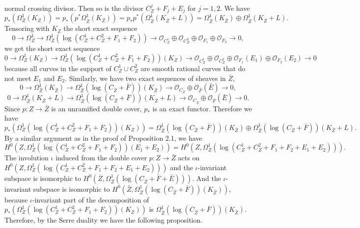 \documentclass[twoside,11pt]{amsart}
\begin{document}
normal crossing divisor. Then so is the divisor $C^j_{Z}+F_j+E_j$
for $j=1,2$. We have
\[p_*(\Omega^1_Z(K_Z))=
p_*(p^*\Omega^1_{\bar Z}(K_Z))=p_*p^*(\Omega^1_{\bar Z}(K_{\bar
Z}+L))= \Omega_{\bar Z}^1(K_{\bar Z})\oplus\Omega^1_{\bar
Z}(K_{\bar Z}+L).\] Tensoring with $K_Z$ the short exact sequence
\[ 0\to \Omega^1_Z \to \Omega^1_Z({\operatorname{log}}(C^1_Z+C^2_Z+F_1+F_2))\to {{\mathcal O}}_{C^1_Z}
\oplus{{\mathcal O}}_{C^2_Z}\oplus{{\mathcal O}}_{F_1}\oplus{{\mathcal O}}_{F_2}\to 0,\] we get the
short exact sequence
\[ 0\to \Omega^1_Z(K_Z)\to \Omega^1_Z({\operatorname{log}}(C^1_Z+C^2_Z+F_1+F_2))(K_Z)\to {{\mathcal O}}_{C^1_Z}
\oplus{{\mathcal O}}_{C^2_Z}\oplus{{\mathcal O}}_{F_1}(E_1)\oplus{{\mathcal O}}_{F_2}(E_2)\to 0\]
because all curves in the support of $C^1_Z\cup C^2_Z$ are smooth
rational curves that do not meet $E_1$ and $E_2$. Similarly, we
have two exact sequences of sheaves in $\bar Z$,
\[ 0\to \Omega^1_{\bar Z}(K_{\bar Z})\to \Omega^1_{\bar Z}({\operatorname{log}}(C_{\bar Z}+\bar F))
(K_{\bar Z})\to
{{\mathcal O}}_{C_{\bar Z}}\oplus{{\mathcal O}}_{\bar F}(\bar E)\to 0,\]
\[ 0\to \Omega^1_{\bar Z}(K_{\bar Z}+L)\to \Omega^1_{\bar Z}({\operatorname{log}}(C_{\bar Z}+\bar F))
(K_{\bar Z}+L)\to {{\mathcal O}}_{C_{\bar Z}}\oplus{{\mathcal O}}_{\bar F}(\bar E)\to
0.\] Since $p : Z\to {\bar Z}$ is an unramified double cover,
$p_*$ is an exact functor. Therefore we have
\[p_*(\Omega^1_Z({\operatorname{log}}(C^1_Z+C^2_Z+F_1+F_2))(K_Z))= \Omega^1_{\bar
Z}({\operatorname{log}}(C_{\bar Z}+\bar F))(K_{\bar Z})\oplus\Omega^1_{\bar
Z}({\operatorname{log}}(C_{\bar Z}+\bar F)) (K_{\bar Z}+L).\] By a similar
argument as in the proof of Proposition 2.1, we have
\[H^0(Z, \Omega^1_Z({\operatorname{log}}(C^1_Z+C^2_Z+F_1+F_2))(E_1+E_2))=H^0(Z,
\Omega^1_Z({\operatorname{log}}(C^1_Z+C^2_Z+F_1+F_2+E_1+E_2))).\] The involution
$\iota$ induced from the double cover $p: Z\to\bar Z$ acts on
$H^0(Z, \Omega^1_Z({\operatorname{log}}(C^1_Z+C^2_Z+F_1+F_2+E_1+E_2)))$ and the
$\iota$-invariant subspace is isomorphic to $H^0(\bar Z,
\Omega^1_{\bar Z}({\operatorname{log}}(C_{\bar Z}+\bar F+\bar E)))$. And the
$\iota$-invariant subspace is isomorphic to $H^0(\bar Z,
\Omega^1_{\bar Z}({\operatorname{log}}(C_{\bar Z}+\bar F))(K_{\bar Z}))$, because
$\iota$-invariant part of the decomposition of
$p_*(\Omega^1_Z({\operatorname{log}}(C^1_Z+C^2_Z+F_1+F_2))(K_Z))$ is
$\Omega^1_{\bar Z}({\operatorname{log}}(C_{\bar Z}+\bar F))(K_{\bar Z})$.
Therefore, by the Serre duality we have the following proposition.
\end{document}
